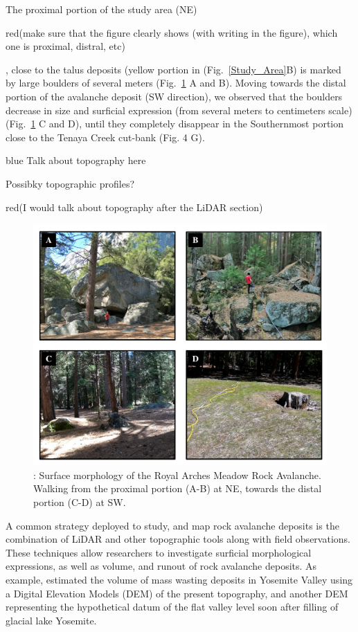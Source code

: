 \documentclass[5p]{elsarticle}
\newcommand{\COMON}{\begin{color}{blue}}
\newcommand{\COMOFF}{\end{color}}
\newcommand{\alon}{\begin{color}{red}}
\newcommand{\aloff}{\end{color}}
\begin{document}
The proximal portion of the study area (NE) \alon(make sure that the figure clearly shows (with writing in the figure), which one is proximal, distral, etc)\aloff, close to the talus deposits (yellow portion in (Fig.~\ref{Study_Area}B) is marked by large boulders of several meters (Fig.~\ref{Study_Area2} A and B). Moving towards the distal portion of the avalanche deposit (SW direction), we observed that the boulders decrease in size and surficial expression (from several meters to centimeters scale) (Fig.~\ref{Study_Area2} C and D), until they completely disappear in the Southernmost portion close to the Tenaya Creek cut-bank (Fig. 4 G).

\COMON
Talk about topography here

Possibky topographic profiles?
\COMOFF

\alon (I would talk about topography after the LiDAR section) \aloff

									\begin{figure}[h]

	\includegraphics[width=\textwidth]{Figures/Study_Area2.pdf}
		\caption{: Surface morphology of the Royal Arches Meadow Rock Avalanche. Walking from the proximal portion (A-B) at NE, towards the distal portion (C-D) at SW. \label{Study_Area2}}

									\end{figure}
			
A common strategy deployed to study, and map rock avalanche deposits is the combination of LiDAR and other topographic tools along with field observations. These techniques allow researchers to investigate surficial morphological expressions, as well as volume, and runout of rock avalanche deposits. As example, \cite{Wieczorek+1996} estimated the volume of mass wasting deposits in Yosemite Valley using  a Digital Elevation Models (DEM) of the present topography, and  another DEM representing the hypothetical datum of the flat valley level soon after filling of glacial lake Yosemite. 
\end{document}
